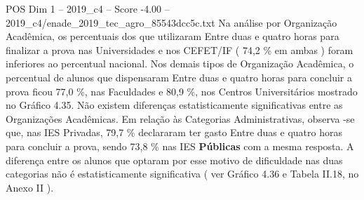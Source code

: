 \begin{textsample}{POS Dim 1 – 2019\_c4 – Score -4.00 – 2019\_c4/enade\_2019\_tec\_agro\_85543dcc5c.txt}
Na análise por Organização Acadêmica, os percentuais dos que utilizaram Entre duas e quatro horas para finalizar a prova nas Universidades e nos CEFET/IF ( 74,2 \% em ambas ) foram inferiores ao percentual nacional.
Nos demais tipos de Organização Acadêmica, o percentual de alunos que dispensaram Entre duas e quatro horas para concluir a prova ficou 77,0 \%, nas Faculdades e 80,9 \%, nos Centros Universitários mostrado no Gráfico 4.35.
Não existem diferenças estatisticamente significativas entre as Organizações Acadêmicas.
Em relação às Categorias Administrativas, observa -se que, nas IES Privadas, 79,7 \% declararam ter gasto Entre duas e quatro horas para concluir a prova, sendo 73,8 \% nas IES \textbf{Públicas} com a mesma resposta.
A diferença entre os alunos que optaram por esse motivo de dificuldade nas duas categorias não é estatisticamente significativa ( ver Gráfico 4.36 e Tabela II.18, no Anexo II ).

\end{textsample}
